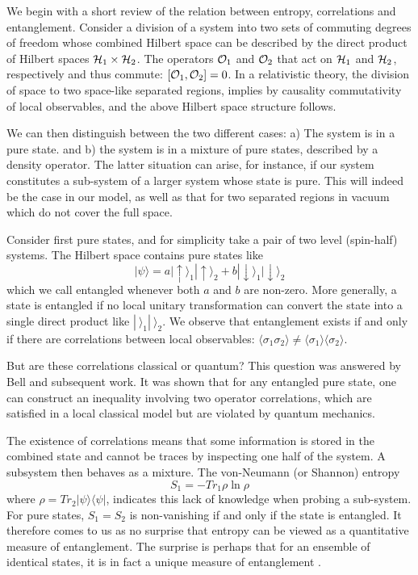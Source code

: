 \documentclass[12pt]{article}
\newcommand{\beq}{\begin{equation}}
\newcommand{\eeq}{\end{equation}}
\def \la {\langle}
\def \ra {\rangle}
\def \up {\uparrow}
\def \down {\downarrow}
\begin{document}
We begin with a short review of the relation between entropy,
correlations  and entanglement. Consider a  division of a system
into two sets of commuting degrees of freedom whose combined
Hilbert space can be described by the direct product of Hilbert
spaces ${\cal H}_1\times{\cal H}_2$. The operators ${\cal O}_1$
and ${\cal O}_2$ that act on ${\cal H}_1$ and ${\cal H}_2$,
respectively and thus commute: $[{\cal O}_1,{\cal O}_2]=0$. In a
relativistic theory, the division of space to two space-like
separated regions, implies by causality commutativity of local
observables, and the above Hilbert space structure follows.



We can then distinguish between the two different cases:
a) The system is in a pure state.
and b) the system is in a mixture of
pure states, described by a density operator.
The latter situation can arise, for instance, if our system
constitutes
a sub-system of a larger system whose state is pure. This will
indeed
be the case in our model, as well as that for two separated
regions
in vacuum which do not cover the full space.

Consider first pure states, and for simplicity take
a pair of two level (spin-half) systems.
The Hilbert space contains pure states like
\beq
|\psi\ra = a|\up\ra_1|\up\ra_2 + b |\down\ra_1|\down\ra_2
\eeq
which we call entangled whenever both $a$ and $b$ are non-zero.
More generally, a state is entangled if no local unitary
transformation can
convert the state into a single direct product like $|\ \ra_1|\
\ra_2$.
We observe that entanglement exists if and only if there are
correlations
between local observables: $\la \sigma_1\sigma_2\ra \neq \la
\sigma_1\ra
\la \sigma_2\ra$.

But are these correlations classical or quantum? This question was
answered by Bell and subsequent work. It was shown that
for any entangled pure state,  one can construct an inequality
involving two operator correlations, which are satisfied in a
local classical model but are violated by quantum mechanics.

The existence of correlations means that some information is
stored
in the combined state and cannot be traces by inspecting one
half of the system. A subsystem then
behaves as a mixture. The von-Neumann (or Shannon) entropy
\beq
S_1= -Tr_1 \rho \ln \rho
\eeq
where $\rho = Tr_2 |\psi\ra \la \psi|$, indicates this
lack of knowledge when probing a sub-system.
For pure states, $S_1=S_2$ is non-vanishing if and only if
the state is entangled.
It therefore comes to us as no surprise that entropy can be
viewed as a
quantitative measure of entanglement. The surprise is perhaps
that
for an ensemble of identical states, it is in fact a unique
measure of
entanglement \cite{concentration,sandu+daniel}.
\end{document}
